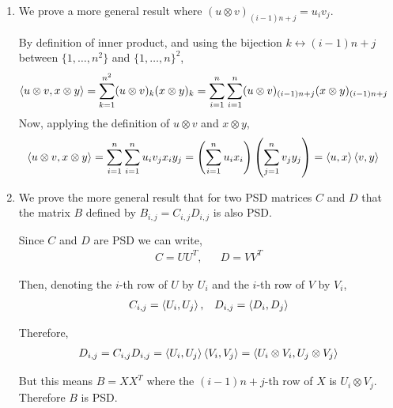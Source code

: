 \documentclass[10pt]{article}
\begin{document}
\begin{solution}[Solution]
\begin{enumerate}[label=(\alph*)]
    \item 
        We prove a more general result where \( (u\otimes v)_{(i-1)n+j} = u_iv_j \). 

        By definition of inner product, and using the bijection \( k \leftrightarrow (i-1)n+j \) between \( \{1,\ldots,n^2\} \) and \( \{1,\ldots,n\}^2 \),
        \begin{align*}
            \left\langle  u\otimes v,x\otimes y \right\rangle 
            &= \sum_{k=1}^{n^2} (u\otimes v)_k (x\otimes y)_k 
            = \sum_{i=1}^{n} \sum_{i=1}^{n} (u\otimes v)_{(i-1)n+j} (x\otimes y)_{(i-1)n+j} 
        \end{align*}
        Now, applying the definition of \( u \otimes v \) and \( x\otimes y \),
        \begin{align*}
            \left\langle u\otimes v,x\otimes y \right\rangle &= \sum_{i=1}^{n} \sum_{i=1}^{n} u_iv_j x_iy_j
            = \left( \sum_{i=1}^{n} u_ix_i \right) \left( \sum_{j=1}^{n} v_jy_j \right)
            = \left\langle u,x \right\rangle\left\langle v,y \right\rangle
        \end{align*}


    \item 
        We prove the more general result that for two PSD matrices \( C \) and \( D \) that the matrix \( B \) defined by \( B_{i,j} = C_{i,j}D_{i,j} \) is also PSD.

        Since \( C \) and \( D \) are PSD we can write,
        \begin{align*}
            C = UU^T, && D = VV^T
        \end{align*}
        
        Then, denoting the \( i \)-th row of \( U \) by \( U_i \) and the \( i \)-th row of \( V \) by \( V_i \),
        \begin{align*}
            C_{i,j} = \left\langle U_i,U_j \right\rangle, 
            &&
            D_{i,j} = \left\langle D_i,D_j \right\rangle
        \end{align*}

        Therefore,
        \begin{align*}
            D_{i,j} = C_{i,j}D_{i,j} = \left\langle U_i,U_j \right\rangle\left\langle V_i,V_j \right\rangle
            = \left\langle  U_i\otimes V_i,U_j\otimes V_j \right\rangle
        \end{align*}

        But this means \( B = XX^T \) where the \( (i-1)n+j \)-th row of \( X \) is \( U_i\otimes V_j \). Therefore \( B \) is PSD. 


\end{enumerate}
\end{solution}
\end{document}
